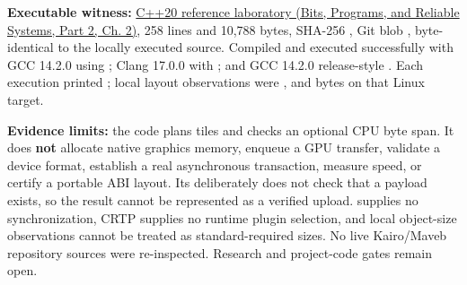 \textbf{Executable witness:} \href{../01-Bits-Programs-and-Reliable-Systems-P02/main.pdf\#nameddest=source-file-f5eb017280bb6b2ae6b1475d}{C++20 reference laboratory (Bits, Programs, and Reliable Systems, Part 2, Ch. 2)}, 258 lines and 10,788 bytes, SHA-256 , Git blob , byte-identical to the locally executed source. Compiled and executed successfully with GCC 14.2.0 using ; Clang 17.0.0 with ; and GCC 14.2.0 release-style . Each execution printed ; local layout observations were ,  and  bytes on that Linux target.

\textbf{Evidence limits:} the code plans tiles and checks an optional CPU byte span. It does \textbf{not} allocate native graphics memory, enqueue a GPU transfer, validate a device format, establish a real asynchronous transaction, measure speed, or certify a portable ABI layout. Its  deliberately does not check that a payload exists, so the result cannot be represented as a verified upload.  supplies no synchronization, CRTP supplies no runtime plugin selection, and local object-size observations cannot be treated as standard-required sizes. No live Kairo/Maveb repository sources were re-inspected. Research and project-code gates remain open.

